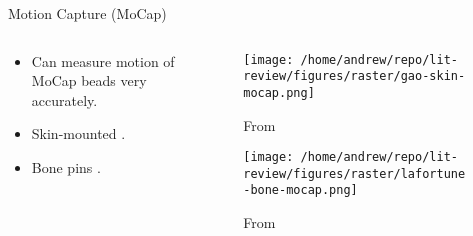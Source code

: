 \documentclass[presentation, aspectratio=1610]{beamer}
\begin{document}
\begin{frame}[label={sec:org8dd1195}]{Motion Capture (MoCap)}
\begin{columns}
\begin{column}{0.5\columnwidth}
\begin{itemize}
\item Can measure motion of MoCap beads very accurately.
\item Skin-mounted \autocites{gaoInvestigationSoftTissue2008}[][]{kuoInfluenceSoftTissue2011}[][]{linEffectsSoftTissue2016}.
\item Bone pins \autocite{lafortuneThreedimensionalKinematicsHuman1992}.
\end{itemize}
\end{column}

\begin{column}{0.6\columnwidth}
\begin{figure}[htbp]
\centering
\texttt{[image: /home/andrew/repo/lit-review/figures/raster/gao-skin-mocap.png]}
\caption{From \autocite{gaoInvestigationSoftTissue2008}}
\end{figure}
\vspace{-0.25in}
\begin{figure}[htbp]
\centering
\texttt{[image: /home/andrew/repo/lit-review/figures/raster/lafortune-bone-mocap.png]}
\caption{From \autocite{lafortuneThreedimensionalKinematicsHuman1992}}
\end{figure}
\end{column}
\end{columns}
\end{frame}
\end{document}
